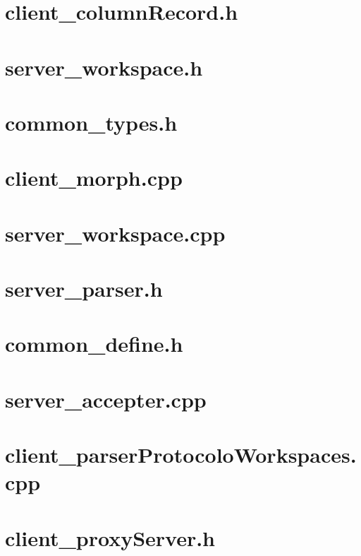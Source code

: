 \documentclass{article}
\begin{document}
\tableofcontents

\newpage
\section{ client\_columnRecord.h}

\newpage
\section{ server\_workspace.h }

\newpage
\section{ common\_types.h }

\newpage
\section{ client\_morph.cpp }

\newpage
\section{ server\_workspace.cpp }

\newpage
\section{ server\_parser.h }

\newpage
\section{ common\_define.h }

\newpage
\section{ server\_accepter.cpp }

\newpage
\section{ client\_parserProtocoloWorkspaces.cpp }

\newpage
\section{ client\_proxyServer.h }

\newpage
\end{document}

